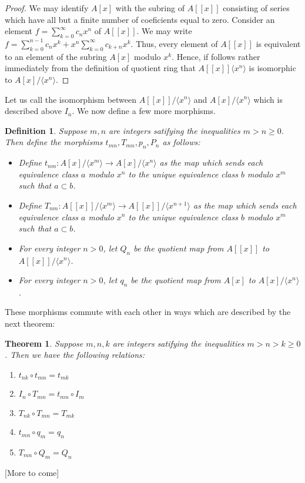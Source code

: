 \documentclass[12pt]{article}
\newtheorem{thm}{Theorem}
\newtheorem{dfn}{Definition}
\begin{document}
\begin{proof}
We may identify $A[x]$ with the subring of $A[[x]]$ consisting
of series which have all but a finite number of coeficients
equal to zero.  Consider an element $f = \sum_{k=0}^\infty c_n 
x^n$ of $A[[x]]$.  We may write $f = \sum_{k=0}^{n-1} c_n x^k 
+ x^n \sum_{k=0}^\infty c_{k+n} x^k$.  Thus, every element of
$A[[x]]$ is equivalent to an element of the subring $A[x]$
modulo $x^k$.  Hence, if follows rather immediately from the
definition of quotient ring that $A[[x]] \langle x^n \rangle$  
is isomorphic to $A[x] / \langle x^n \rangle$.
\end{proof}

Let us call the isomorphism between 
$A[[x]] / \langle x^n \rangle$ and $A[x] / \langle x^n \rangle$
which is described above $I_n$.  We now define a few more morphisms.

\begin{dfn}
Suppose $m,n$ are integers satifying the inequalities 
$m > n \ge 0$.  Then define the morphisms $t_{mn}, T_{mn},
p_n, P_n$ as follows:
\begin{itemize}
\item Define
$t_{nm} \colon A[x] / \langle x^{m} \rangle \to A[x] / 
\langle x^{n} \rangle$ as the map which sends each
equivalence class $a$ modulo $x^{n}$ to the unique equivalence 
class $b$ modulo $x^{m}$ such that $a \subset b$.
\item Define
$T_{nm} \colon A[[x]] / \langle x^{m} \rangle \to A[[x]] / 
\langle x^{n+1} \rangle$ as the map which sends each
equivalence class $a$ modulo $x^{n}$ to the unique equivalence 
class $b$ modulo $x^{m}$ such that $a \subset b$.
\item For every integer $n > 0$, let $Q_n$ be the quotient
map from $A[[x]]$ to $A[[x]] / \langle x^n \rangle$.
\item For every integer $n > 0$, let $q_n$ be the quotient
map from $A[x]$ to $A[x] / \langle x^n \rangle$.
\end{itemize}
\end{dfn}

These morphisms commute with each other in ways which are
described by the next theorem:

\begin{thm}
Suppose $m,n,k$ are integers satifying the inequalities 
$m > n > k \ge 0$.  Then we have the following relations:
\begin{enumerate}
\item $t_{nk} \circ t_{mn} = t_{mk}$
\item $I_n \circ T_{mn} = t_{mn} \circ I_m$
\item $T_{nk} \circ T_{mn} = T_{mk}$
\item $t_{mn} \circ q_m = q_n$
\item $T_{mn} \circ Q_m = Q_n$
\end{enumerate}
\end{thm}
[More to come]


\end{document}
